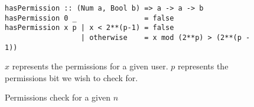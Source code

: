 \begin{figure}[H]
  \centering
  \begin{verbatim}
hasPermission :: (Num a, Bool b) => a -> a -> b
hasPermission 0 _                = false
hasPermission x p | x < 2**(p-1) = false
                  | otherwise    = x mod (2**p) > (2**(p - 1))
  \end{verbatim}
  \caption{
  	Permissions check for a given $n$
  }{
  	$x$ represents the permissions for a given user. $p$ represents the permissions bit we wish to check for.
  }
  \label{code:storage_permissions_check}
\end{figure}
